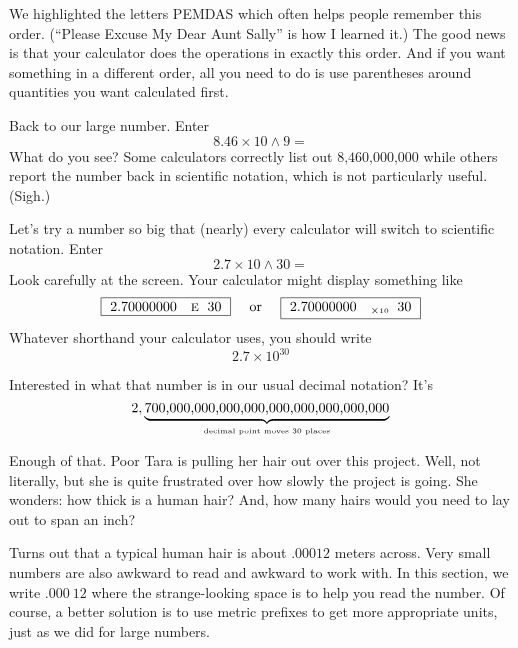 \noindent We highlighted the letters PEMDAS  which often helps people remember this order. (``Please Excuse My Dear Aunt Sally'' is how I learned it.)  The good news is that your calculator does the operations in exactly this order.  And if you want something in a different order, all you need to do is use parentheses around quantities you want calculated first.
 
Back to our large number.  Enter $$8.46 \times 10 \wedge 9=$$
What do you see?  Some calculators correctly list out $\text{8,460,000,000}$ while others report the number back in scientific notation, which is not particularly useful. (Sigh.)  

Let's try a number so big that (nearly) every calculator will switch to scientific notation.  Enter $$2.7\times 10 \wedge 30=$$
Look carefully at the screen.  Your calculator might display something like 
$$\boxed{~2.70000000 \quad \text{\begin{footnotesize}E \end{footnotesize}}~30~} \text{ \quad or \quad } \boxed{~2.70000000 \quad _{ \times \text{\begin{tiny}10 \end{tiny}}}~30~}$$ 
Whatever shorthand your calculator uses, you should write $$2.7 \times 10^{30}$$

Interested in what that number is in our usual decimal notation?  It's
$$2, \underbrace{ \hbox{$\text{700,000,000,000,000,000,000,000,000,000} $}}_{\hbox{\begin{tiny} decimal point moves 30 places \end{tiny}}}$$

Enough of that. Poor Tara is pulling her hair out over this project.  Well, not literally, but she is quite frustrated over how slowly the project is going.  She wonders: how thick is a human hair?  And, how many hairs would you need to lay out to span an inch?

Turns out that a typical human hair is about $.00012$ meters across.  Very small numbers are also awkward to read and awkward to work with.  In this section, we write  $.000~12$ where the strange-looking space is to help you read the number.  Of course, a better solution is to use metric prefixes to get more appropriate units, just as we did for large numbers.

